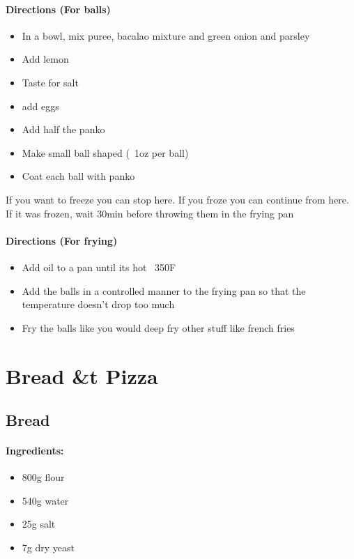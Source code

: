 \documentclass{article}
\begin{document}
\paragraph{Directions (For balls)}
\begin{itemize}
	\item In a bowl, mix puree, bacalao mixture and green onion and parsley
	\item Add lemon
	\item Taste for salt
	\item add  eggs
	\item Add half the panko 
	\item Make small ball shaped (~1oz per ball)
	\item Coat each ball with panko
\end{itemize}

If you want to freeze you can stop here. If you froze you can continue from here. If it was frozen, wait 30min before throwing them in the frying pan

\paragraph{Directions (For frying)}
\begin{itemize}
	\item Add oil to a pan until its hot ~350F
	\item Add the balls in a controlled manner to the frying pan so that the temperature doesn't drop too much
	\item Fry the balls like you would deep fry other stuff like french fries
\end{itemize}

\section{Bread \&t Pizza}

\subsection{Bread}{}

\paragraph{Ingredients:}

\begin{itemize}
	\item 800g flour
	\item 540g water
	\item 25g salt
	\item 7g dry yeast
\end{itemize}
\end{document}
